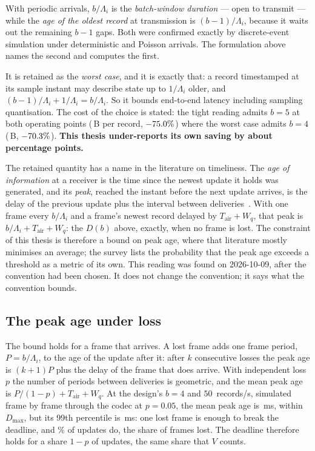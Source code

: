 \begin{remark}
With periodic arrivals, $b/\Lambda_i$ is the \emph{batch-window duration} --- open to transmit ---
while the \emph{age of the oldest record} at transmission is $(b-1)/\Lambda_i$, because it waits out
the remaining $b-1$ gaps. Both were confirmed exactly by discrete-event simulation under
deterministic and Poisson arrivals. The formulation above names the second and computes the first.

It is retained as the \emph{worst case}, and it is exactly that: a record timestamped at its sample
instant may describe state up to $1/\Lambda_i$ older, and $(b-1)/\Lambda_i + 1/\Lambda_i =
b/\Lambda_i$. So it bounds end-to-end latency including sampling quantisation. The cost of the
choice is stated: the tight reading admits $b = 5$ at both operating points
(\bprLeanFive\,B per record, $-75.0\%$) where the worst case admits $b = 4$
(\bprLeanDesign\,B, $-70.3\%$). \textbf{This thesis under-reports its own saving by about
\saveFiveGain{} percentage points.}

The retained quantity has a name in the literature on timeliness. The \emph{age of
information} at a receiver is the time since the newest update it holds was generated, and its
\emph{peak}, reached the instant before the next update arrives, is the delay of the previous
update plus the interval between deliveries~\cite{yates2021aoi}. With one frame every
$b/\Lambda_i$ and a frame's newest record delayed by $T_{\mathrm{air}} + W_q$, that peak is
$b/\Lambda_i + T_{\mathrm{air}} + W_q$: the $D(b)$ above, exactly, when no frame is lost. The
constraint of this thesis is therefore a bound on peak age, where that literature mostly
minimises an average; the survey lists the probability that the peak age exceeds a threshold as
a metric of its own. This reading was found on 2026-10-09, after the convention had been
chosen. It does not change the convention; it says what the convention bounds.
\end{remark}

\subsection{The peak age under loss}\label{sec:aoi-loss}

The bound holds for a frame that arrives. A lost frame adds one frame period, $P = b/\Lambda_i$,
to the age of the update after it: after $k$ consecutive losses the peak age is $(k+1)P$ plus the
delay of the frame that does arrive. With independent loss $p$ the number of periods between
deliveries is geometric, and the mean peak age is $P/(1-p) + T_{\mathrm{air}} + W_q$. At the
design's $b = 4$ and $50$~records/s, simulated frame by frame through the codec at $p = 0.05$,
the mean peak age is \aoiPeakMean\,ms, within $D_{\max}$, but its 99th percentile is
\aoiPeakPnn\,ms: one lost frame is enough to break the deadline, and \aoiOverPct\% of updates do,
the share of frames lost. The deadline therefore holds for a share $1-p$ of updates, the same
share that $V$ counts.

